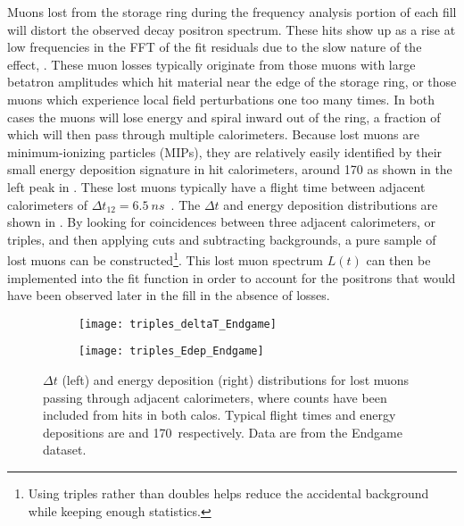 Muons lost from the storage ring during the frequency analysis portion of each fill will distort the observed decay positron spectrum. These hits show up as a rise at low frequencies in the FFT of the fit residuals due to the slow nature of the effect, . These muon losses typically originate from those muons with large betatron amplitudes which hit material near the edge of the storage ring, or those muons which experience local field perturbations one too many times. In both cases the muons will lose energy and spiral inward out of the ring, a fraction of which will then pass through multiple calorimeters. Because lost muons are minimum-ionizing particles (MIPs), they are relatively easily identified by their small energy deposition signature in hit calorimeters, around 170 \MeV as shown in the left peak in . These lost muons typically have a flight time between adjacent calorimeters of $\Delta t_{12} = \SI{6.5}{ns}$~\cite{lostmuonspaper,lostmuonsDenverTalk}. The $\Delta t$ and energy deposition distributions are shown in . By looking for coincidences between three adjacent calorimeters, or triples, and then applying cuts and subtracting backgrounds, a pure sample of lost muons can be constructed\footnote{Using triples rather than doubles helps reduce the accidental background while keeping enough statistics.}. This lost muon spectrum $L(t)$ can then be implemented into the fit function in order to account for the positrons that would have been observed later in the fill in the absence of losses.

\begin{figure}
\centering
    \begin{subfigure}[]{0.48\textwidth}
        \centering
        \texttt{[image: triples\_deltaT\_Endgame]}
    \end{subfigure}%
    \begin{subfigure}[]{0.48\textwidth}
        \centering
        \texttt{[image: triples\_Edep\_Endgame]}
    \end{subfigure}
\caption[Lost muon $\Delta t$ and energy deposition distributions]{$\Delta t$ (left) and energy deposition (right) distributions for lost muons passing through adjacent calorimeters, where counts have been included from hits in both calos. Typical flight times and energy depositions are  and 170~\MeV respectively. Data are from the Endgame dataset.}
\label{fig:lostmuondistributions}
\end{figure}



